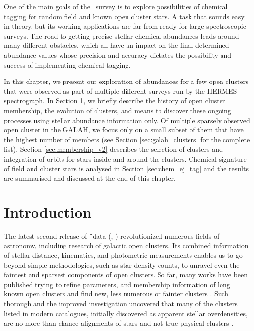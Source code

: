 One of the main goals of the \Gh\ survey is to explore possibilities of chemical tagging for random field and known open cluster stars. A task that sounds easy in theory, but its working applications are far from ready for large spectroscopic surveys. The road to getting precise stellar chemical abundances leads around many different obstacles, which all have an impact on the final determined abundance values whose precision and accuracy dictates the possibility and success of implementing chemical tagging.

In this chapter, we present our exploration of abundances for a few open clusters that were observed as part of multiple different surveys run by the HERMES spectrograph. In Section \ref{sec:intro_tag}, we briefly describe the history of open cluster membership, the evolution of clusters, and means to discover these ongoing processes using stellar abundance information only. Of multiple sparsely observed open cluster in the GALAH, we focus only on a small subset of them that have the highest number of members (see Section \ref{sec:galah_clusters} for the complete list). Section \ref{sec:membership_v2} describes the selection of clusters and integration of orbits for stars inside and around the clusters. Chemical signature of field and cluster stars is analysed in Section \ref{sec:chem_ej_tag} and the results are summarised and discussed at the end of this chapter.

\section{Introduction}
\label{sec:intro_tag}
The latest second release of \G\ data (\Gs, \cite{2018A&A...616A...1G}) revolutionized numerous fields of astronomy, including research of galactic open clusters. Its combined information of stellar distance, kinematics, and photometric measurements enables us to go beyond simple methodologies, such as star density counts, to unravel even the faintest and sparsest components of open clusters. So far, many works have been published trying to refine parameters, and membership information of long known open clusters \cite{2017A&A...601A..19G, 2018A&A...618A..93C, 2019A&A...627A..35C} and find new, less numerous or fainter clusters \cite{2019ApJS..245...32L, 2019JKAS...52..145S, 2019A&A...624A.126C, 2020arXiv200107122C}. Such thorough and the improved investigation uncovered that many of the clusters listed in modern catalogues, initially discovered as apparent stellar overdensities, are no more than chance alignments of stars and not true physical clusters \cite{1998A&A...340..402B, 2000A&A...357..145C, 2016AJ....152....7H, 2018MNRAS.480.5242K, 2020A&A...633A..99C}.

